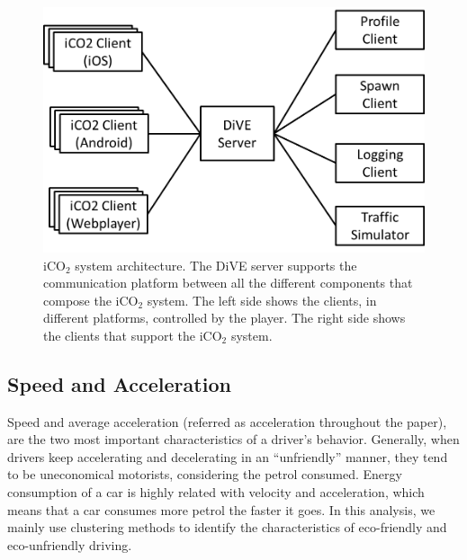 \documentclass[preprint,authoryear,12pt]{elsarticle}
\begin{document}
\begin{figure}[htb]
\begin{center}
\includegraphics[width=.6\linewidth]{ijhcs14-img/iCO2_generalarchitecture}
\caption{iCO$_2$ system architecture. The DiVE server supports the communication platform between all the different components that compose the iCO$_2$ system. The left side shows the clients, in different platforms, controlled by the player. The right side shows the clients that support the iCO$_2$ system.\label{fig:iCO2_generalarchitecture}}
\end{center}
\end{figure}


\subsection{Speed and Acceleration}

Speed and average acceleration (referred as acceleration throughout the paper), are the two most important characteristics of a driver's behavior. Generally, when drivers keep accelerating and decelerating in an ``unfriendly'' manner, they tend to be uneconomical motorists, considering the petrol consumed. Energy consumption of a car is highly related with velocity and acceleration, which means that a car consumes more petrol the faster it goes. In this analysis, we mainly use clustering methods to identify the characteristics of eco-friendly and eco-unfriendly driving.

\end{document}
